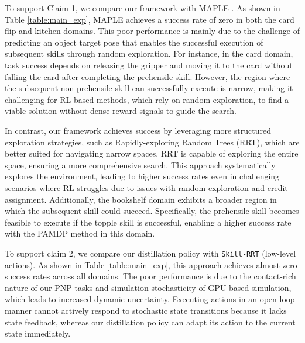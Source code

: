 To support Claim 1, we compare our framework with MAPLE \cite{nasiriany2022augmenting}. As shown in Table \ref{table:main_exp}, MAPLE achieves a success rate of zero in both the card flip and kitchen domains. This poor performance is mainly due to the challenge of predicting an object target pose that enables the successful execution of subsequent skills through random exploration. For instance, in the card domain, task success depends on releasing the gripper and moving it to the card without falling the card after completing the prehensile skill. However, the region where the subsequent non-prehensile skill can successfully execute is narrow, making it challenging for RL-based methods, which rely on random exploration, to find a viable solution without dense reward signals to guide the search.

In contrast, our framework achieves success by leveraging more structured exploration strategies, such as Rapidly-exploring Random Trees (RRT), which are better suited for navigating narrow spaces. RRT is capable of exploring the entire space, ensuring a more comprehensive search. This approach systematically explores the environment, leading to higher success rates even in challenging scenarios where RL struggles due to issues with random exploration and credit assignment. Additionally, the bookshelf domain exhibits a broader region in which the subsequent skill could succeed. Specifically, the prehensile skill becomes feasible to execute if the topple skill is successful, enabling a higher success rate with the PAMDP method in this domain.

To support claim 2, we compare our distillation policy with \texttt{Skill-RRT} (low-level actions). As shown in Table \ref{table:main_exp}, this approach achieves almost zero success rates across all domains. The poor performance is due to the contact-rich nature of our PNP tasks and simulation stochasticity of GPU-based simulation, which leads to increased dynamic uncertainty. Executing actions in an open-loop manner cannot actively respond to stochastic state transitions because it lacks state feedback, whereas our distillation policy can adapt its action to the current state immediately.


